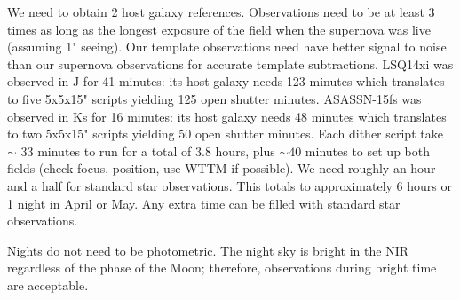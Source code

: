 \documentclass[11pt]{article}
\begin{document}
\technicaldescription

We need to obtain 2 host galaxy references. 
Observations need to be at least 3 times as long as the longest exposure of the field when the supernova was live (assuming 1" seeing). 
Our template observations need have better signal to noise than our supernova observations for accurate template subtractions. 
LSQ14xi was observed in J for 41 minutes:  its host galaxy needs 123 minutes which translates to five 5x5x15" scripts yielding 125 open shutter minutes.
ASASSN-15fs was observed in Ks for 16 minutes: its host galaxy needs 48 minutes which translates to two 5x5x15" scripts yielding 50 open shutter minutes.
Each dither script take $\sim$ 33 minutes to run for a total of 3.8 hours, plus $\sim40$ minutes to set up both fields (check focus, position, use WTTM if possible).
We need roughly an hour and a half for standard star observations.
This totals to approximately 6 hours or 1 night in April or May.
Any extra time can be filled with standard star observations.

Nights do not need to be photometric. 
The night sky is bright in the NIR regardless of the phase of the Moon; therefore, observations during bright time are acceptable. 

%
%
\end{document}
